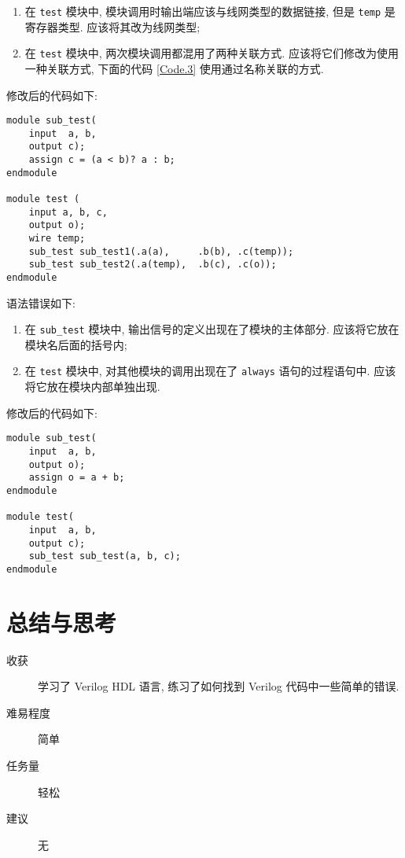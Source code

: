 \documentclass[UTF8,fontset=fandol]{ctexart}
\begin{document}
\begin{ExQuestions}
\begin{enumerate}
        \item 在 \texttt{test} 模块中, 模块调用时输出端应该与线网类型的数据链接, 但是 \texttt{temp} 是寄存器类型. 应该将其改为线网类型;
        \item 在 \texttt{test} 模块中, 两次模块调用都混用了两种关联方式. 应该将它们修改为使用一种关联方式, 下面的代码 \ref{Code.3} 使用通过名称关联的方式.
    \end{enumerate}
    修改后的代码如下:
    \begin{lstlisting}[style = verilogstyle, caption = {修改后的题目 4.}, label = {Code.3}]
module sub_test(
    input  a, b,
    output c);
    assign c = (a < b)? a : b;
endmodule

module test (
    input a, b, c,
    output o);
    wire temp;
    sub_test sub_test1(.a(a),     .b(b), .c(temp));
    sub_test sub_test2(.a(temp),  .b(c), .c(o));
endmodule     
    \end{lstlisting}
    \question 语法错误如下:
    \begin{enumerate}
        \item 在 \texttt{sub\_test} 模块中, 输出信号的定义出现在了模块的主体部分. 应该将它放在模块名后面的括号内;
        \item 在 \texttt{test} 模块中, 对其他模块的调用出现在了 \texttt{always} 语句的过程语句中. 应该将它放在模块内部单独出现.
    \end{enumerate}
    修改后的代码如下: \newpage
    \begin{lstlisting}[style = verilogstyle, caption = {修改后的题目 5.}, label = {Code.4}]
module sub_test(
    input  a, b,
    output o);
    assign o = a + b;
endmodule

module test(
    input  a, b,
    output c);
    sub_test sub_test(a, b, c);
endmodule
    \end{lstlisting}
\end{ExQuestions}
\section*{总结与思考}
\begin{description}
    \item[收获] 学习了 Verilog HDL 语言, 练习了如何找到 Verilog 代码中一些简单的错误.
    \item[难易程度] 简单
    \item[任务量] 轻松
    \item[建议] 无   
\end{description}
\end{document}
